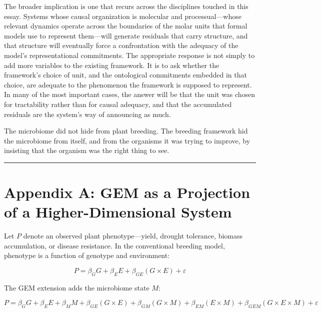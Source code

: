 \documentclass[11pt, a4paper]{article}
\begin{document}
The broader implication is one that recurs across the disciplines touched in this essay. Systems whose causal organization is molecular and processual---whose relevant dynamics operate across the boundaries of the molar units that formal models use to represent them---will generate residuals that carry structure, and that structure will eventually force a confrontation with the adequacy of the model's representational commitments. The appropriate response is not simply to add more variables to the existing framework. It is to ask whether the framework's choice of unit, and the ontological commitments embedded in that choice, are adequate to the phenomenon the framework is supposed to represent. In many of the most important cases, the answer will be that the unit was chosen for tractability rather than for causal adequacy, and that the accumulated residuals are the system's way of announcing as much.

The microbiome did not hide from plant breeding. The breeding framework hid the microbiome from itself, and from the organisms it was trying to improve, by insisting that the organism was the right thing to see.

\bigskip
\begin{center}
\textcolor{darkgray}{\rule{0.4\textwidth}{0.4pt}}
\end{center}
\bigskip


\renewcommand{\thesection}{\Alph{appendixctr}}

\setcounter{appendixctr}{1}
\section*{Appendix A: GEM as a Projection of a Higher-Dimensional System}

Let $P$ denote an observed plant phenotype---yield, drought tolerance, biomass accumulation, or disease resistance. In the conventional breeding model, phenotype is a function of genotype and environment:

\[
P = \beta_G G + \beta_E E + \beta_{GE}(G \times E) + \varepsilon
\]

The GEM extension adds the microbiome state $M$:

\[
P = \beta_G G + \beta_E E + \beta_M M + \beta_{GE}(G \times E) + \beta_{GM}(G \times M) + \beta_{EM}(E \times M) + \beta_{GEM}(G \times E \times M) + \varepsilon
\]
\end{document}
